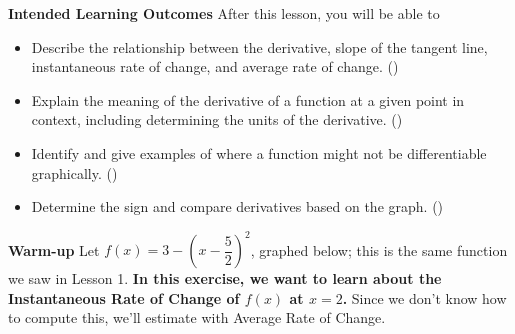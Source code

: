 \documentclass[10pt]{article}
\begin{document}
\pagestyle{otherpages}
\thispagestyle{firstpage}

\textbf{Intended Learning Outcomes}
After this lesson, you will be able to 

\begin{itemize}
    \item Describe the relationship between the derivative, slope of the tangent line, instantaneous rate of change, and average rate of change. ()
    \item Explain the meaning of the derivative of a function at a given point in context, including determining the units of the derivative. ()
    \item Identify and give examples of where a function might not be differentiable graphically. ()
    \item Determine the sign and compare derivatives based on the graph. ()
\end{itemize}

\vspace{-0.5cm}

\hrulefill

{\bf\color{blue}Warm-up}  Let $f(x) = 3-\left(x-\dfrac52\right)^2$, graphed below; this is the same function we saw in Lesson 1. {\bf In this exercise, we want to learn about the Instantaneous Rate of Change of $f(x)$ at $x=2$.} Since we don't know how to compute this, we'll estimate with Average Rate of Change.\\
\end{document}
